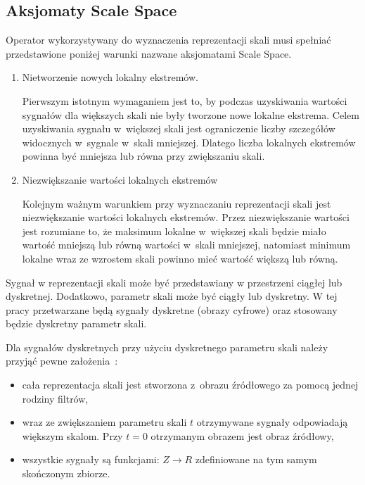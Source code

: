 \subsection{Aksjomaty Scale Space}
\label{subsec:aksjomaty}

Operator wykorzystywany do wyznaczenia reprezentacji skali musi spełniać przedstawione poniżej warunki nazwane aksjomatami Scale Space\cite{ScaleSpaceAxioms}. 

\begin{enumerate}
\item Nietworzenie nowych lokalny ekstremów.

Pierwszym istotnym wymaganiem jest to, by podczas uzyskiwania wartości sygnałów dla większych skali nie były tworzone nowe lokalne ekstrema. Celem uzyskiwania sygnału w~większej skali jest ograniczenie liczby szczegółów widocznych w~sygnale w~skali mniejszej. Dlatego liczba lokalnych ekstremów powinna być mniejsza lub równa przy zwiększaniu skali.

\item Niezwiększanie wartości lokalnych ekstremów

Kolejnym ważnym warunkiem przy wyznaczaniu reprezentacji skali jest niezwiększanie wartości lokalnych ekstremów. Przez niezwiększanie wartości jest rozumiane to, że maksimum lokalne w~większej skali będzie miało wartość mniejszą lub równą wartości w~skali mniejszej, natomiast minimum lokalne wraz ze wzrostem skali powinno mieć wartość większą lub równą.

\end{enumerate}

Sygnał w reprezentacji skali może być przedstawiany w przestrzeni ciągłej lub dyskretnej. Dodatkowo, parametr skali może być ciągły lub dyskretny. W tej pracy przetwarzane będą sygnały dyskretne (obrazy cyfrowe) oraz stosowany będzie dyskretny parametr skali.

Dla sygnałów dyskretnych przy użyciu dyskretnego parametru skali należy przyjąć pewne założenia~\cite{SSFDS}:
\begin{itemize}
\item cała reprezentacja skali jest stworzona z~obrazu źródłowego za pomocą jednej rodziny filtrów,
\item wraz ze zwiększaniem parametru skali $ t $ otrzymywane sygnały odpowiadają większym skalom. Przy $ t = 0 $ otrzymanym obrazem jest obraz źródłowy,
\item wszystkie sygnały są funkcjami: $ Z \rightarrow R $ zdefiniowane na tym samym skończonym zbiorze.
\end{itemize}

